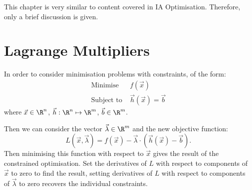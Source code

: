 \documentclass[../Main.tex]{subfiles}
\begin{document}
This chapter is very similar to content covered in IA Optimisation. Therefore, only a brief discussion is given.
\section{Lagrange Multipliers}
In order to consider minimisation problems with constraints, of the form:
\begin{align*}
    \text{Minimise }&f(\vec{x}) \\
    \text{Subject to }& \vec{h}(\vec{x}) = \vec{b}
\end{align*}
where $\vec{x} \in \R^n$, $\vec{h} : \R^n \mapsto \R^m$, $\vec{b} \in \R^m$.

Then we can consider the vector $\vec{\lambda} \in \R^m$ and the new objective function:
\begin{equation*}
    L(\vec{x}, \vec{\lambda}) = f(\vec{x}) - \vec{\lambda} \cdot (\vec{h}(\vec{x}) - \vec{b}).
\end{equation*}
Then minimising this function with respect to $\vec{x}$ gives the result of the constrained optimisation. Set the derivatives of $L$ with respect to components of $\vec{x}$ to zero to find the result, setting derivatives of $L$ with respect to components of $\vec{\lambda}$ to zero recovers the individual constraints.
\end{document}

